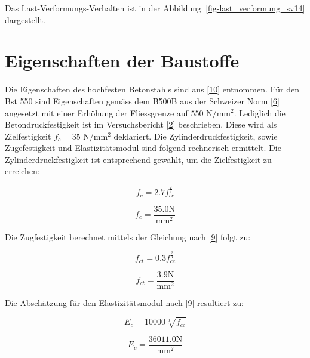 \documentclass[
  12pt,
  letterpaper,
  egregdoesnotlikesansseriftitles]{scrreprt}
\begin{document}
Das Last-Verformungs-Verhalten ist in der
Abbildung~\ref{fig-last_verformung_sv14} dargestellt.

\hypertarget{eigenschaften-der-baustoffe-1}{%
\section{Eigenschaften der
Baustoffe}\label{eigenschaften-der-baustoffe-1}}

Die Eigenschaften des hochfesten Betonstahls sind aus
{[}\protect\hyperlink{ref-annahutte_broschure}{10}{]} entnommen. Für den
Bst 550 sind Eigenschaften gemäss dem B500B aus der Schweizer Norm
{[}\protect\hyperlink{ref-SIA2013a}{6}{]} angesetzt mit einer Erhöhung
der Fliessgrenze auf \(550 \text{ N}/\text{mm}^2\). Lediglich die
Betondruckfestigkeit ist im Versuchsbericht
{[}\protect\hyperlink{ref-Tue2019}{2}{]} beschrieben. Diese wird als
Zielfestigkeit \(f_c = 35 \text{ N}/\text{mm}^2\) deklariert. Die
Zylinderdruckfestigkeit, sowie Zugefestigkeit und Elastizitätsmodul sind
folgend rechnerisch ermittelt. Die Zylinderdruckfestigkeit ist
entsprechend gewählt, um die Zielfestigkeit zu erreichen:

\begin{equation}f_{c} = 2.7 f_{cc}^{\frac{2}{3}}\end{equation}

\begin{equation}f_{c} = \frac{35.0 \text{N}}{\text{mm}^{2}}\end{equation}

Die Zugfestigkeit berechnet mittels der Gleichung nach
{[}\protect\hyperlink{ref-Jaeger2013}{9}{]} folgt zu:

\begin{equation}f_{ct} = 0.3 f_{cc}^{\frac{2}{3}}\end{equation}

\begin{equation}f_{ct} = \frac{3.9 \text{N}}{\text{mm}^{2}}\end{equation}

Die Abschätzung für den Elastizitätsmodul nach
{[}\protect\hyperlink{ref-Jaeger2013}{9}{]} resultiert zu:

\begin{equation}E_{c} = 10000 \sqrt[3]{f_{cc}}\end{equation}

\begin{equation}E_{c} = \frac{36011.0 \text{N}}{\text{mm}^{2}}\end{equation}
\end{document}
